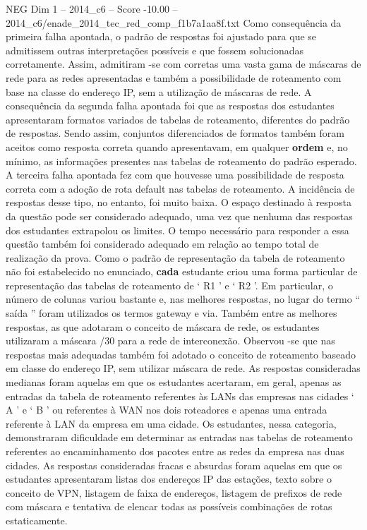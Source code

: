\begin{textsample}{NEG Dim 1 – 2014\_c6 – Score -10.00 – 2014\_c6/enade\_2014\_tec\_red\_comp\_f1b7a1aa8f.txt}
Como consequência da primeira falha apontada, o padrão de respostas foi ajustado para que se admitissem outras interpretações possíveis e que fossem solucionadas corretamente.
Assim, admitiram -se com corretas uma vasta gama de máscaras de rede para as redes apresentadas e também a possibilidade de roteamento com base na classe do endereço IP, sem a utilização de máscaras de rede.
A consequência da segunda falha apontada foi que as respostas dos estudantes apresentaram formatos variados de tabelas de roteamento, diferentes do padrão de respostas.
Sendo assim, conjuntos diferenciados de formatos também foram aceitos como resposta correta quando apresentavam, em qualquer \textbf{ordem} e, no mínimo, as informações presentes nas tabelas de roteamento do padrão esperado.
A terceira falha apontada fez com que houvesse uma possibilidade de resposta correta com a adoção de rota default nas tabelas de roteamento.
A incidência de respostas desse tipo, no entanto, foi muito baixa.
O espaço destinado à resposta da questão pode ser considerado adequado, uma vez que nenhuma das respostas dos estudantes extrapolou os limites.
O tempo necessário para responder a essa questão também foi considerado adequado em relação ao tempo total de realização da prova.
Como o padrão de representação da tabela de roteamento não foi estabelecido no enunciado, \textbf{cada} estudante criou uma forma particular de representação das tabelas de roteamento de ‘ R1 ’ e ‘ R2 ’.
Em particular, o número de colunas variou bastante e, nas melhores respostas, no lugar do termo “ saída ” foram utilizados os termos gateway e via.
Também entre as melhores respostas, as que adotaram o conceito de máscara de rede, os estudantes utilizaram a máscara /30 para a rede de interconexão.
Observou -se que nas respostas mais adequadas também foi adotado o conceito de roteamento baseado em classe do endereço IP, sem utilizar máscara de rede.
As respostas consideradas medianas foram aquelas em que os estudantes acertaram, em geral, apenas as entradas da tabela de roteamento referentes às LANs das empresas nas cidades ‘ A ’ e ‘ B ’ ou referentes à WAN nos dois roteadores e apenas uma entrada referente à LAN da empresa em uma cidade.
Os estudantes, nessa categoria, demonstraram dificuldade em determinar as entradas nas tabelas de roteamento referentes ao encaminhamento dos pacotes entre as redes da empresa nas duas cidades.
As respostas consideradas fracas e absurdas foram aquelas em que os estudantes apresentaram listas dos endereços IP das estações, texto sobre o conceito de VPN, listagem de faixa de endereços, listagem de prefixos de rede com máscara e tentativa de elencar todas as possíveis combinações de rotas estaticamente.

\end{textsample}
